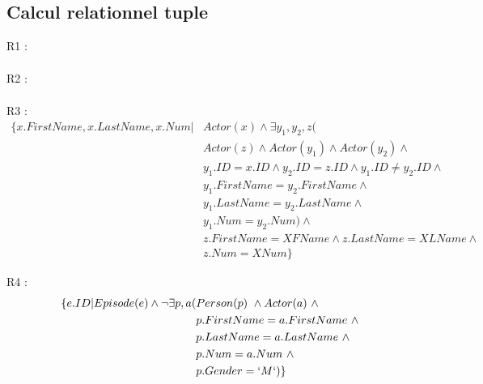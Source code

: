 \documentclass[a4paper,12pt]{article}
\begin{document}
\subsection{Calcul relationnel tuple}
\begin{list}{-}{}
  \item R1 :
    \begin{align*}
    \end{align*}
  \item R2 :
    \begin{align*}
    \end{align*}
  \item R3 :
    \begin{align*}
      \{ x.FirstName, x.LastName, x.Num | &Actor(x) \wedge \exists y_1, y_2, z ( \\
      &Actor(z) \wedge Actor(y_1) \wedge Actor(y_2) \wedge \\
      &y_1.ID = x.ID \wedge y_2.ID = z.ID \wedge y_1.ID \neq y_2.ID \wedge\\
      &y_1.FirstName = y_2.FirstName \wedge \\
      &y_1.LastName = y_2.LastName \wedge \\
      &y_1.Num = y_2.Num) \wedge \\
      &z.FirstName = XFName \wedge z.LastName = XLName \wedge \\
      &z.Num = XNum\}
    \end{align*}
  \item R4 :
    \begin{align*}
      \{ e.ID | Episode(e) \wedge \lnot \exists p, a (&Person(p) ~\wedge Actor(a) ~\wedge \\
        & p.FirstName = a.FirstName ~\wedge \\
        & p.LastName = a.LastName ~\wedge \\
        & p.Num = a.Num ~\wedge \\
        & p.Gender = `M`)\}
    \end{align*}
\end{list}
          
\end{document}
